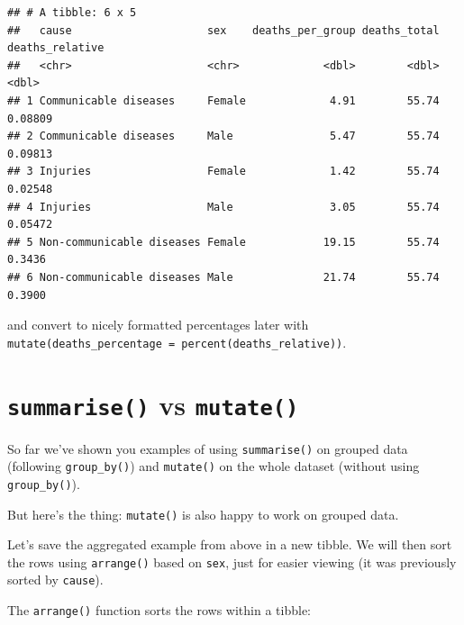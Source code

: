 \documentclass[
  12pt,
  krantz2]{krantz}
\makeatletter
\newenvironment{Shaded}{\begin{snugshade}}{\end{snugshade}}
\newcommand{\DataTypeTok}[1]{\textcolor[rgb]{0.13,0.29,0.53}{#1}}
\newcommand{\KeywordTok}[1]{\textcolor[rgb]{0.13,0.29,0.53}{\textbf{#1}}}
\newcommand{\NormalTok}[1]{#1}
\newcommand{\OperatorTok}[1]{\textcolor[rgb]{0.81,0.36,0.00}{\textbf{#1}}}
\newcommand{\StringTok}[1]{\textcolor[rgb]{0.31,0.60,0.02}{#1}}
\newenvironment{kframe}{%
\medskip{}
\setlength{\fboxsep}{.8em}
 \def\at@end@of@kframe{}%
 \ifinner\ifhmode%
  \def\at@end@of@kframe{\end{minipage}}%
  \begin{minipage}{\columnwidth}%
 \fi\fi%
 \def\FrameCommand##1{\hskip\@totalleftmargin \hskip-\fboxsep
 \colorbox{shadecolor}{##1}\hskip-\fboxsep
     \hskip-\linewidth \hskip-\@totalleftmargin \hskip\columnwidth}%
 \MakeFramed {\advance\hsize-\width
   \@totalleftmargin\z@ \linewidth\hsize
   \@setminipage}}%
 {\par\unskip\endMakeFramed%
 \at@end@of@kframe}
\renewenvironment{Shaded}{\begin{kframe}}{\end{kframe}}
\makeatother
\begin{document}
\begin{verbatim}
## # A tibble: 6 x 5
##   cause                     sex    deaths_per_group deaths_total deaths_relative
##   <chr>                     <chr>             <dbl>        <dbl>           <dbl>
## 1 Communicable diseases     Female             4.91        55.74         0.08809
## 2 Communicable diseases     Male               5.47        55.74         0.09813
## 3 Injuries                  Female             1.42        55.74         0.02548
## 4 Injuries                  Male               3.05        55.74         0.05472
## 5 Non-communicable diseases Female            19.15        55.74         0.3436 
## 6 Non-communicable diseases Male              21.74        55.74         0.3900
\end{verbatim}

and convert to nicely formatted percentages later with \texttt{mutate(deaths\_percentage\ =\ percent(deaths\_relative))}.

\hypertarget{summarise-vs-mutate}{%
\section{\texorpdfstring{\texttt{summarise()} vs \texttt{mutate()}}{summarise() vs mutate()}}\label{summarise-vs-mutate}}

So far we've shown you examples of using \texttt{summarise()} on grouped data (following \texttt{group\_by()}) and \texttt{mutate()} on the whole dataset (without using \texttt{group\_by()}).

But here's the thing: \texttt{mutate()} is also happy to work on grouped data.

Let's save the aggregated example from above in a new tibble.
We will then sort the rows using \texttt{arrange()} based on \texttt{sex}, just for easier viewing (it was previously sorted by \texttt{cause}).

The \texttt{arrange()} function sorts the rows within a tibble:

\begin{Shaded}
\end{Shaded}
\end{document}
